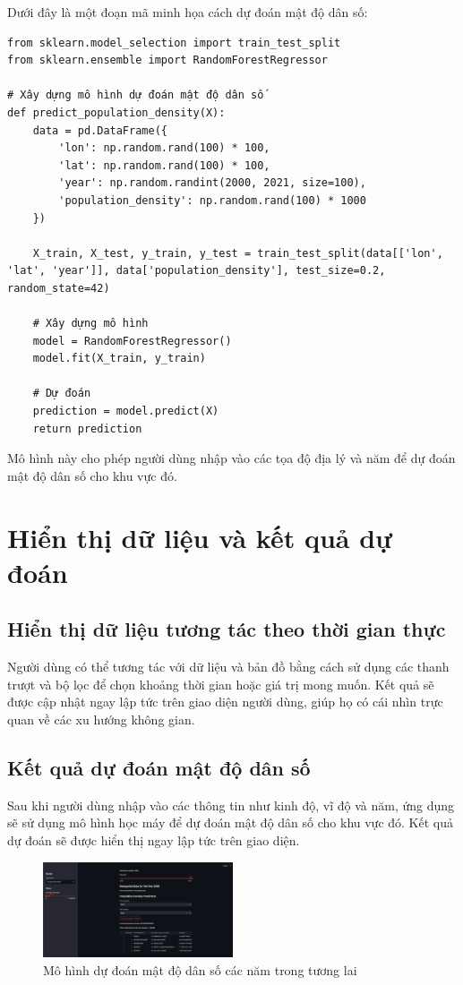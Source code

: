 \documentclass[a4paper,12pt]{report}
\begin{document}
Dưới đây là một đoạn mã minh họa cách dự đoán mật độ dân số:

\begin{verbatim}
from sklearn.model_selection import train_test_split
from sklearn.ensemble import RandomForestRegressor

# Xây dựng mô hình dự đoán mật độ dân số
def predict_population_density(X):
    data = pd.DataFrame({
        'lon': np.random.rand(100) * 100,
        'lat': np.random.rand(100) * 100,
        'year': np.random.randint(2000, 2021, size=100),
        'population_density': np.random.rand(100) * 1000
    })
    
    X_train, X_test, y_train, y_test = train_test_split(data[['lon', 'lat', 'year']], data['population_density'], test_size=0.2, random_state=42)
    
    # Xây dựng mô hình
    model = RandomForestRegressor()
    model.fit(X_train, y_train)
    
    # Dự đoán
    prediction = model.predict(X)
    return prediction
\end{verbatim}

Mô hình này cho phép người dùng nhập vào các tọa độ địa lý và năm để dự đoán mật độ dân số cho khu vực đó.

\section{Hiển thị dữ liệu và kết quả dự đoán}
\subsection{Hiển thị dữ liệu tương tác theo thời gian thực}
Người dùng có thể tương tác với dữ liệu và bản đồ bằng cách sử dụng các thanh trượt và bộ lọc để chọn khoảng thời gian hoặc giá trị mong muốn. Kết quả sẽ được cập nhật ngay lập tức trên giao diện người dùng, giúp họ có cái nhìn trực quan về các xu hướng không gian.

\subsection{Kết quả dự đoán mật độ dân số}
Sau khi người dùng nhập vào các thông tin như kinh độ, vĩ độ và năm, ứng dụng sẽ sử dụng mô hình học máy để dự đoán mật độ dân số cho khu vực đó. Kết quả dự đoán sẽ được hiển thị ngay lập tức trên giao diện.

\begin{figure}[h]
    \centering
    \includegraphics[width=0.5\textwidth]{image/predict_population.png}
    \caption{Mô hình dự đoán mật độ dân số các năm trong tương lai}
    \label{fig:population}
\end{figure}
\end{document}

